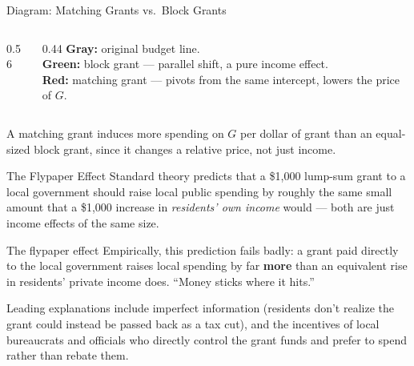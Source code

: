 \documentclass[11pt,aspectratio=169]{beamer}
\begin{document}
\begin{frame}{Diagram: Matching Grants vs.\ Block Grants}
  \begin{columns}[T]
    \begin{column}{0.56\textwidth}
    \end{column}
    \begin{column}{0.44\textwidth}
      \scriptsize
      \textcolor{wugray}{\textbf{Gray:}} original budget line.\\[0.3em]
      \textcolor{wugreen}{\textbf{Green:}} block grant --- parallel shift, a pure income effect.\\[0.3em]
      \textcolor{wured}{\textbf{Red:}} matching grant --- pivots from the same intercept, lowers the price of $G$.
    \end{column}
  \end{columns}
  \vspace{0.3em}
  \scriptsize A matching grant induces more spending on $G$ per dollar of grant than an equal-sized block grant, since it changes a relative price, not just income.
\end{frame}

\begin{frame}{The Flypaper Effect}
  Standard theory predicts that a \$1,000 lump-sum grant to a local government should raise local public spending by roughly the same small amount that a \$1,000 increase in \emph{residents' own income} would --- both are just income effects of the same size.
  \begin{alertblock}{The flypaper effect}
    Empirically, this prediction fails badly: a grant paid directly to the local government raises local spending by far \textbf{more} than an equivalent rise in residents' private income does. ``Money sticks where it hits.''
  \end{alertblock}
  \small Leading explanations include imperfect information (residents don't realize the grant could instead be passed back as a tax cut), and the incentives of local bureaucrats and officials who directly control the grant funds and prefer to spend rather than rebate them.
\end{frame}
\end{document}
